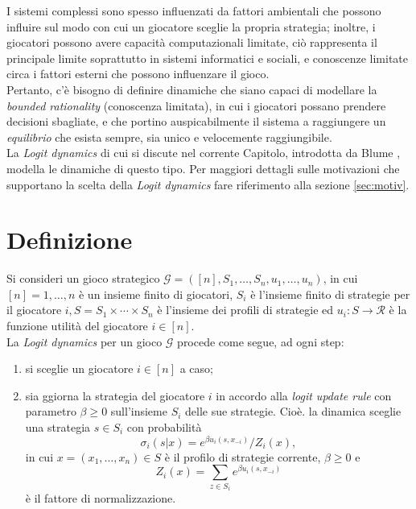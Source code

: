 I sistemi complessi sono spesso influenzati da fattori ambientali che possono influire sul modo con cui un giocatore sceglie la propria strategia; inoltre, i giocatori possono avere capacità computazionali limitate, ciò rappresenta il principale limite soprattutto in sistemi informatici e sociali, e conoscenze limitate circa i fattori esterni che possono influenzare il gioco.\\
Pertanto, c’è bisogno di definire dinamiche che siano capaci di modellare la \textit{bounded rationality} (conoscenza limitata), in cui i giocatori possano prendere decisioni sbagliate, e che portino auspicabilmente il sistema a raggiungere un \textit{equilibrio} che esista sempre, sia unico e velocemente raggiungibile.\\
La \textit{Logit dynamics} di cui si discute nel corrente Capitolo, introdotta da Blume \cite{blume1993statistical}, modella le dinamiche di questo tipo. Per maggiori dettagli sulle motivazioni che supportano la scelta della \textit{Logit dynamics} fare riferimento alla sezione \ref{sec:motiv}.
\section{Definizione}
Si consideri un gioco strategico $\mathcal{G} = ([n], S_1, \dots, S_n, u_1, \dots, u_n)$, in cui $[n] = {1, \dots, n}$ è un insieme finito di giocatori, $S_i$ è l'insieme finito di strategie per il giocatore $i, S = S_1 \times \cdots \times S_n$ è l'insieme dei profili di strategie ed $u_i: S \rightarrow \mathcal{R}$ è la funzione utilità del giocatore $i \in [n]$.\\
La \textit{Logit dynamics} per un gioco $\mathcal{G}$ procede come segue, ad ogni step:
\begin{enumerate}
	\item si sceglie un giocatore $i \in [n]$ a caso;
	\item sia ggiorna la strategia del giocatore $i$ in accordo alla \textit{logit update rule} con parametro $\beta \geq 0$ sull'insieme $S_i$ delle sue strategie. Cioè. la dinamica sceglie una strategia $s \in S_i$ con probabilità
	\begin{equation}
		\sigma_i (s|x) = e^{\beta u_i (s, x_{-i})}/Z_i(x),
		\label{sigmai}
	\end{equation}
	in cui $x = (x_1, \dots, x_n) \in S$ è il profilo di strategie corrente, $\beta \geq 0$ e
	\begin{equation}
		Z_i(x) = \sum_{z\in S_i}{e^{\beta u_i (s, x_{-i})}}
	\end{equation}
	è il fattore di normalizzazione.
\end{enumerate}

